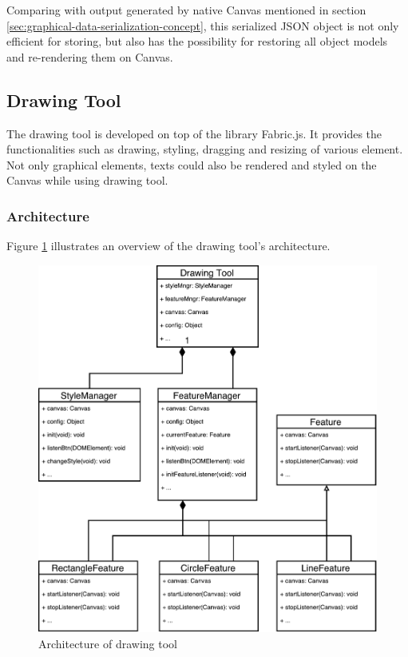 Comparing with output generated by native Canvas mentioned in section \ref{sec:graphical-data-serialization-concept}, this serialized JSON object is not only efficient for storing, but also has the possibility for restoring all object models and re-rendering them on Canvas.

\subsection{Drawing Tool}
The drawing tool is developed on top of the library Fabric.js. It provides the functionalities such as drawing, styling, dragging and resizing of various element. Not only graphical elements, texts could also be rendered and styled on the Canvas while using drawing tool.

\subsubsection{Architecture}


Figure \ref{fig:drawing-tool-arch-imp} illustrates an overview of the drawing tool's architecture. 

\begin{figure}[!htbp]
  \centering
    \includegraphics[width=1\textwidth]{Figures/imp-drawing-tool-arch.pdf}
  \caption{Architecture of drawing tool}
  \label{fig:drawing-tool-arch-imp}
\end{figure}

